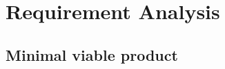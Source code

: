 \section{Requirement Analysis}
\label{sec:requirements-analysis}

\subsection{Minimal viable product}
\label{ssec:mvp}

